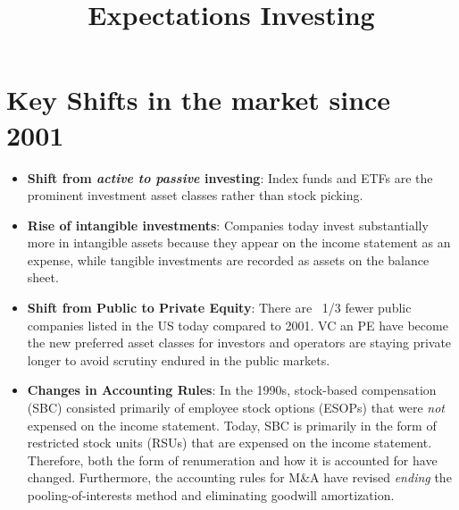 \documentclass[english,titlepage]{article}
\begin{document}
\title{\textbf{Expectations Investing} \\ 
\date{}
}
\maketitle
\section{Key Shifts in the market since 2001}
\begin{itemize}
    \item \textbf{Shift from \emph{active to passive} investing}: Index funds and ETFs are the prominent investment asset classes rather than stock picking. 
    \item \textbf{Rise of intangible investments}: Companies today invest substantially more in intangible assets because they appear on the income statement as an expense, while tangible investments are recorded as assets on the balance sheet. 
    \item \textbf{Shift from Public to Private Equity}: There are ~1/3 fewer public companies listed in the US today compared to 2001. VC an PE have become the new preferred asset classes for investors and operators are staying private longer to avoid scrutiny endured in the public markets. 
    \item \textbf{Changes in Accounting Rules}: In the 1990s, stock-based compensation (SBC) consisted primarily of employee stock options (ESOPs) that were \emph{not} expensed on the income statement. 
                                                Today, SBC is primarily in the form of restricted stock units (RSUs) that are expensed on the income statement. 
                                                Therefore, both the form of renumeration and how it is accounted for have changed. Furthermore, the accounting rules for M\&A have revised \emph{ending} the pooling-of-interests method and eliminating goodwill amortization. 
\end{itemize}
\end{document}
